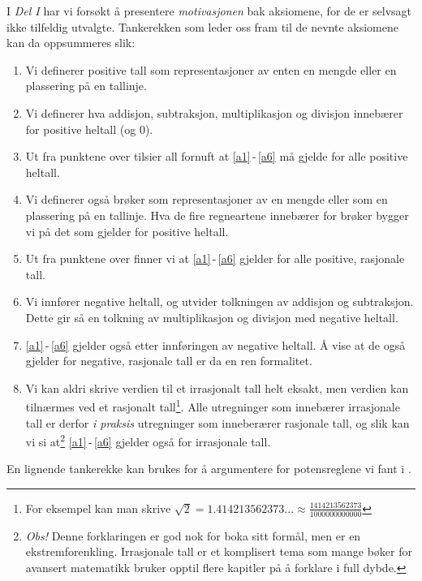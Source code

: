 \newpage
I \textsl{Del I} har vi forsøkt å presentere \textsl{motivasjonen} bak aksiomene, for de er selvsagt ikke tilfeldig utvalgte. Tankerekken som leder oss fram til de nevnte aksiomene kan da oppsummeres slik:
\begin{enumerate}
	\item Vi definerer positive tall som representasjoner av enten en mengde eller en plassering på en tallinje.
	\item Vi definerer hva addisjon, subtraksjon, multiplikasjon og divisjon innebærer for positive heltall (og 0).
	\item Ut fra punktene over tilsier all fornuft at \eqref{a1}\,-\,\eqref{a6} må gjelde for alle positive heltall.
	\item Vi definerer også brøker som representasjoner av en mengde eller som en plassering på en tallinje. Hva de fire regneartene innebærer for brøker bygger vi på det som gjelder for positive heltall.
	\item Ut fra punktene over finner vi at \eqref{a1}\,-\,\eqref{a6} gjelder for alle positive, rasjonale tall.
	\item Vi innfører negative heltall, og utvider tolkningen av addisjon og subtraksjon. Dette gir så en tolkning av multiplikasjon og divisjon med negative heltall.
	\item \eqref{a1}\,-\,\eqref{a6} gjelder også etter innføringen av negative heltall. Å vise at de også gjelder for negative, rasjonale tall er da en ren formalitet.
	\item Vi kan aldri skrive verdien til et irrasjonalt tall helt eksakt, men verdien kan tilnærmes ved et rasjonalt tall\footnote{For eksempel kan man skrive $ \sqrt{2}=1.414213562373...\approx\frac{1414213562373}{1000000000000} $}. Alle utregninger som innebærer irrasjonale tall er derfor \textsl{i praksis} utregninger som inneberærer rasjonale tall, og slik kan vi si at\footnote{\textit{Obs!} Denne forklaringen er god nok for boka sitt formål, men er en ekstrem\qquad forenkling. Irrasjonale tall er et komplisert tema som mange bøker for avansert matematikk bruker opptil flere kapitler på å forklare i full dybde.} \eqref{a1}\,-\,\eqref{a6} gjelder også for irrasjonale tall.
\end{enumerate}
En lignende tankerekke kan brukes for å argumentere for potensreglene vi fant i . 


